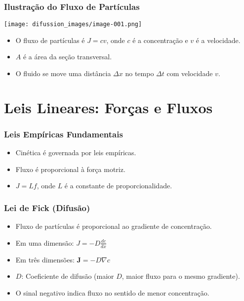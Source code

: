 \documentclass[11pt]{beamer}
\begin{document}
\begin{frame}
    \frametitle{Ilustração do Fluxo de Partículas}
    \begin{center}
        \texttt{[image: difussion\_images/image-001.png]}
    \end{center}
    \begin{itemize}
        \item O fluxo de partículas é $J = cv$, onde $c$ é a concentração e $v$ é a velocidade.
        \item $A$ é a área da seção transversal.
        \item O fluido se move uma distância $\Delta x$ no tempo $\Delta t$ com velocidade $v$.
    \end{itemize}
\end{frame}

\section{Leis Lineares: Forças e Fluxos}

\begin{frame}
    \frametitle{Leis Empíricas Fundamentais}
    \begin{itemize}
        \item Cinética é governada por leis empíricas.
        \item Fluxo é proporcional à força motriz.
        \item $J = Lf$, onde $L$ é a constante de proporcionalidade.
    \end{itemize}
\end{frame}

\begin{frame}
    \frametitle{Lei de Fick (Difusão)}
    \begin{itemize}
        \item Fluxo de partículas é proporcional ao gradiente de concentração.
        \item Em uma dimensão: $J = -D \frac{dc}{dx}$
        \item Em três dimensões: $\mathbf{J} = -D \nabla c$
        \item $D$: Coeficiente de difusão (maior $D$, maior fluxo para o mesmo gradiente).
        \item O sinal negativo indica fluxo no sentido de menor concentração.
    \end{itemize}
\end{frame}
\end{document}
